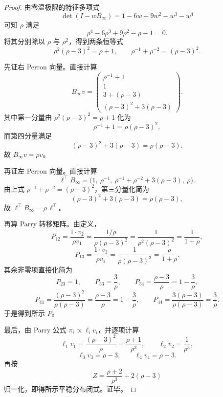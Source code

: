 \begin{proof}
由零温极限的特征多项式
\[
\det(I-wB_\infty)=1-6w+9w^2-w^3-w^4
\]
可知 \(\rho\) 满足
\[
\rho^4-6\rho^3+9\rho^2-\rho-1=0.
\]
将其分别除以 \(\rho\) 与 \(\rho^2\)，得到两条恒等式
\[
\rho^2(\rho-3)^2=\rho+1,
\qquad
\rho^{-1}+\rho^{-2}=(\rho-3)^2.
\]

先证右 Perron 向量。直接计算
\[
B_\infty v
=
\begin{pmatrix}
\rho^{-1}+1\\
1\\
3+(\rho-3)\\
(\rho-3)^2+3(\rho-3)
\end{pmatrix}.
\]
其中第一分量由 \(\rho^2(\rho-3)^2=\rho+1\) 化为
\[
\rho^{-1}+1=\rho(\rho-3)^2,
\]
而第四分量满足
\[
(\rho-3)^2+3(\rho-3)=\rho(\rho-3).
\]
故 \(B_\infty v=\rho v\)。

再证左 Perron 向量。直接计算
\[
\ell^{\top}B_\infty
=
\bigl(1,\ \rho^{-1},\ \rho^{-1}+\rho^{-2}+3(\rho-3),\ \rho\bigr).
\]
由上式 \(\rho^{-1}+\rho^{-2}=(\rho-3)^2\)，第三分量化简为
\[
(\rho-3)^2+3(\rho-3)=\rho(\rho-3),
\]
故 \(\ell^{\top}B_\infty=\rho\,\ell^{\top}\)。

再算 Parry 转移矩阵。由定义，
\[
P_{12}
=
\frac{1\cdot v_2}{\rho v_1}
=
\frac{1/\rho}{\rho(\rho-3)^2}
=
\frac{1}{\rho^2(\rho-3)^2}
=
\frac{1}{1+\rho},
\]
\[
P_{13}
=
\frac{1\cdot v_3}{\rho v_1}
=
\frac{1}{\rho(\rho-3)^2}
=
\frac{\rho}{1+\rho}.
\]
其余非零项直接化简为
\[
P_{23}=1,\qquad
P_{33}=\frac{3}{\rho},\qquad
P_{34}=\frac{\rho-3}{\rho}=1-\frac{3}{\rho},
\]
\[
P_{41}=\frac{(\rho-3)^2}{\rho(\rho-3)}=\frac{\rho-3}{\rho}=1-\frac{3}{\rho},
\qquad
P_{44}=\frac{3(\rho-3)}{\rho(\rho-3)}=\frac{3}{\rho}.
\]
于是得到所示 \(P\)。

最后，由 Parry 公式 \(\pi_i\propto \ell_i v_i\)，并逐项计算
\[
\ell_1v_1=\frac{(\rho-3)^2}{\rho}=\frac{\rho+1}{\rho^3},
\qquad
\ell_2v_2=\frac{1}{\rho^3},
\]
\[
\ell_3v_3=\rho-3,
\qquad
\ell_4v_4=\rho-3.
\]
再按
\[
Z=\frac{\rho+2}{\rho^3}+2(\rho-3)
\]
归一化，即得所示平稳分布闭式。证毕。
\end{proof}
